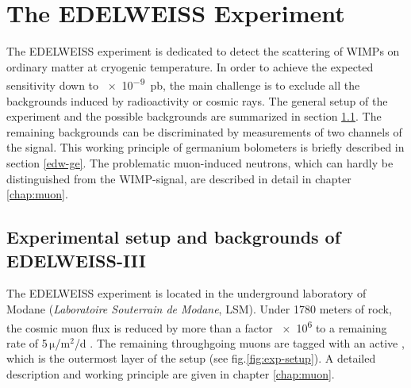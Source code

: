 
\section{The EDELWEISS Experiment}
  \label{edw}
  The EDELWEISS experiment is dedicated to detect the scattering of WIMPs on ordinary matter at cryogenic temperature. In order to achieve the expected sensitivity down to \SI{e-9}{pb}, the main challenge is to exclude all the backgrounds induced by radioactivity or cosmic rays. The general setup of the experiment and the possible backgrounds are summarized in section \ref{sec:edw-exp}. The remaining backgrounds can be discriminated by measurements of two channels of the signal. This working principle of germanium bolometers is briefly described in section \ref{edw-ge}.
  The problematic muon-induced neutrons, which can hardly be distinguished from the WIMP-signal, are described in detail in chapter \ref{chap:muon}.
\subsection{Experimental setup and backgrounds of EDELWEISS-III}
  \label{sec:edw-exp}
  The EDELWEISS experiment is located in the underground laboratory of Modane (\textit{Laboratoire Souterrain de Modane}, LSM). Under 1780 meters of rock, the cosmic muon flux is reduced by more than a factor \num{e6} to a remaining rate of 5\,$\mathrm{\mu}$/$\mathrm{m}^{2}$/d \cite{Sch13a}.
  The remaining throughgoing muons are tagged with an active \mvs, which is the outermost layer of the setup (see fig.\ref{fig:exp-setup}). A detailed description and working principle are given in chapter \ref{chap:muon}.

